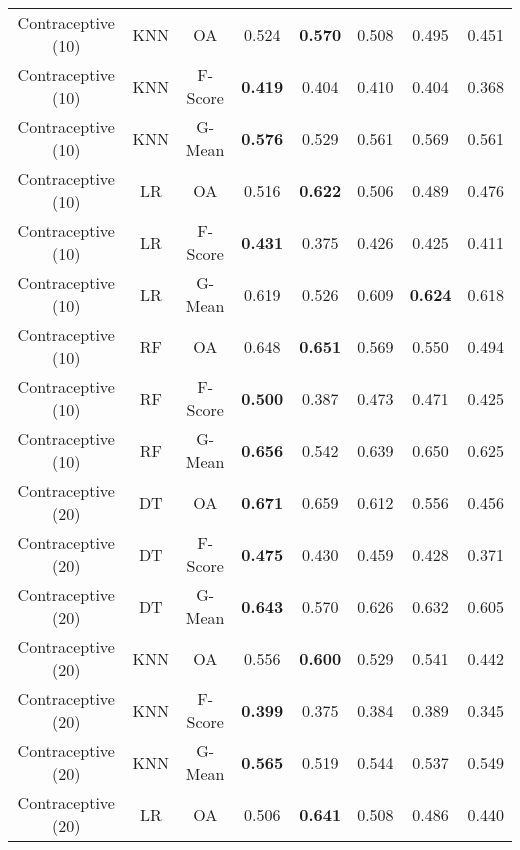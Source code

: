 \begin{longtable}{cccccccc}
Contraceptive (10) &        KNN &      OA &          0.524 & \textbf{0.570} &          0.508 &          0.495 &          0.451 \\
Contraceptive (10) &        KNN & F-Score & \textbf{0.419} &          0.404 &          0.410 &          0.404 &          0.368 \\
Contraceptive (10) &        KNN &  G-Mean & \textbf{0.576} &          0.529 &          0.561 &          0.569 &          0.561 \\
Contraceptive (10) &         LR &      OA &          0.516 & \textbf{0.622} &          0.506 &          0.489 &          0.476 \\
Contraceptive (10) &         LR & F-Score & \textbf{0.431} &          0.375 &          0.426 &          0.425 &          0.411 \\
Contraceptive (10) &         LR &  G-Mean &          0.619 &          0.526 &          0.609 & \textbf{0.624} &          0.618 \\
Contraceptive (10) &         RF &      OA &          0.648 & \textbf{0.651} &          0.569 &          0.550 &          0.494 \\
Contraceptive (10) &         RF & F-Score & \textbf{0.500} &          0.387 &          0.473 &          0.471 &          0.425 \\
Contraceptive (10) &         RF &  G-Mean & \textbf{0.656} &          0.542 &          0.639 &          0.650 &          0.625 \\
Contraceptive (20) &         DT &      OA & \textbf{0.671} &          0.659 &          0.612 &          0.556 &          0.456 \\
Contraceptive (20) &         DT & F-Score & \textbf{0.475} &          0.430 &          0.459 &          0.428 &          0.371 \\
Contraceptive (20) &         DT &  G-Mean & \textbf{0.643} &          0.570 &          0.626 &          0.632 &          0.605 \\
Contraceptive (20) &        KNN &      OA &          0.556 & \textbf{0.600} &          0.529 &          0.541 &          0.442 \\
Contraceptive (20) &        KNN & F-Score & \textbf{0.399} &          0.375 &          0.384 &          0.389 &          0.345 \\
Contraceptive (20) &        KNN &  G-Mean & \textbf{0.565} &          0.519 &          0.544 &          0.537 &          0.549 \\
Contraceptive (20) &         LR &      OA &          0.506 & \textbf{0.641} &          0.508 &          0.486 &          0.440 \\

\end{longtable}
